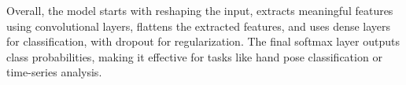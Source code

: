 Overall, the model starts with reshaping the input, extracts meaningful features using convolutional layers, flattens the extracted features, and uses dense layers for classification, with dropout for regularization. The final softmax layer outputs class probabilities, making it effective for tasks like hand pose classification or time-series analysis.